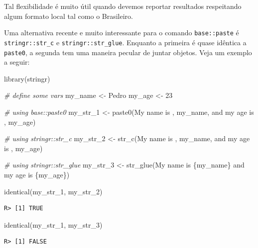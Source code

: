 \documentclass[
  11pt,
]{book}
\newenvironment{Shaded}{\begin{snugshade}}{\end{snugshade}}
\newcommand{\CommentTok}[1]{\textcolor[rgb]{0.37,0.37,0.37}{\textit{#1}}}
\newcommand{\DecValTok}[1]{\textcolor[rgb]{0.06,0.06,0.06}{#1}}
\newcommand{\FunctionTok}[1]{\textcolor[rgb]{0,0,0}{#1}}
\newcommand{\NormalTok}[1]{#1}
\newcommand{\OtherTok}[1]{\textcolor[rgb]{0.37,0.37,0.37}{#1}}
\newcommand{\StringTok}[1]{\textcolor[rgb]{0.5,0.5,0.5}{#1}}
\begin{document}
Tal flexibilidade é muito útil quando devemos reportar resultados respeitando algum formato local tal como o Brasileiro.

Uma alternativa recente e muito interessante para o comando \texttt{base::paste} é \texttt{stringr::str\_c} e \texttt{stringr::str\_glue}. Enquanto a primeira é quase idêntica a \texttt{paste0}, a segunda tem uma maneira pecular de juntar objetos. Veja um exemplo a seguir:

\begin{Shaded}
\begin{Highlighting}[]
\FunctionTok{library}\NormalTok{(stringr)}

\CommentTok{\# define some vars}
\NormalTok{my\_name }\OtherTok{\textless{}{-}} \StringTok{\textquotesingle{}Pedro\textquotesingle{}}
\NormalTok{my\_age }\OtherTok{\textless{}{-}} \DecValTok{23}

\CommentTok{\# using base::paste0}
\NormalTok{my\_str\_1 }\OtherTok{\textless{}{-}} \FunctionTok{paste0}\NormalTok{(}\StringTok{\textquotesingle{}My name is \textquotesingle{}}\NormalTok{, my\_name, }\StringTok{\textquotesingle{} and my age is \textquotesingle{}}\NormalTok{, my\_age)}

\CommentTok{\# using stringr::str\_c}
\NormalTok{my\_str\_2 }\OtherTok{\textless{}{-}} \FunctionTok{str\_c}\NormalTok{(}\StringTok{\textquotesingle{}My name is \textquotesingle{}}\NormalTok{, my\_name, }\StringTok{\textquotesingle{} and my age is \textquotesingle{}}\NormalTok{, my\_age)}

\CommentTok{\# using stringr::str\_glue}
\NormalTok{my\_str\_3 }\OtherTok{\textless{}{-}} \FunctionTok{str\_glue}\NormalTok{(}\StringTok{\textquotesingle{}My name is \{my\_name\} and my age is \{my\_age\}\textquotesingle{}}\NormalTok{)}

\FunctionTok{identical}\NormalTok{(my\_str\_1, my\_str\_2)}
\end{Highlighting}
\end{Shaded}

\begin{verbatim}
R> [1] TRUE
\end{verbatim}

\begin{Shaded}
\begin{Highlighting}[]
\FunctionTok{identical}\NormalTok{(my\_str\_1, my\_str\_3)}
\end{Highlighting}
\end{Shaded}

\begin{verbatim}
R> [1] FALSE
\end{verbatim}
\end{document}
